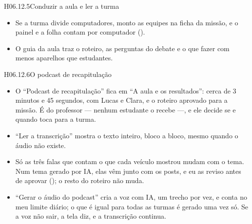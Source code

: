 \begin{historia}{H06.12.5}{Conduzir a aula e ler a turma}{\parcial}
\begin{itemize}
    a aula à exploração. Nada é apagado: a rodada anterior fica no painel de
    habilidades. A janela avisa que, com o mesmo tema, a surpresa do Mural se
    perde, e sugere trocar o tema.
  \item Se a turma divide computadores, monto as equipes na ficha da missão, e
    o painel e a folha contam por computador ().
  \item O guia da aula traz o roteiro, as perguntas do debate e o que fazer com
    menos aparelhos que estudantes.
\end{itemize}
\end{historia}

\begin{historia}{H06.12.6}{O podcast de recapitulação}{\parcial}
\aceite
\begin{itemize}
  \item O \enquote{Podcast de recapitulação} fica em \enquote{A aula e os
    resultados}: cerca de 3 minutos e 45 segundos, com Lucas e Clara, e o
    roteiro aprovado para a missão. É do professor --- nenhum estudante o
    recebe ---, e ele decide se e quando toca para a turma.
  \item \enquote{Ler a transcrição} mostra o texto inteiro, bloco a bloco,
    mesmo quando o áudio não existe.
  \item Só as três falas que contam o que cada veículo mostrou mudam com o
    tema. Num tema gerado por IA, elas vêm junto com os posts, e eu as reviso
    antes de aprovar (); o resto do roteiro não muda.
  \item \enquote{Gerar o áudio do podcast} cria a voz com IA, um trecho por
    vez, e conta no meu limite diário; o que é igual para todas as turmas é
    gerado uma vez só. Se a voz não sair, a tela diz, e a transcrição continua.
\end{itemize}
\end{historia}

